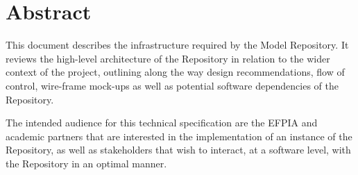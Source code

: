 \section*{Abstract}
\label{abstract}
This document describes the infrastructure required by the \ddmore Model Repository. It reviews the high-level architecture of the Repository in relation to the wider context of the project, outlining along the way design recommendations, flow of control, wire-frame mock-ups as well as potential software dependencies of the Repository.

The intended audience for this technical specification are the EFPIA and academic partners that are interested in the implementation of an instance of the Repository, as well as stakeholders that wish to interact, at a software level, with the Repository in an optimal manner.
